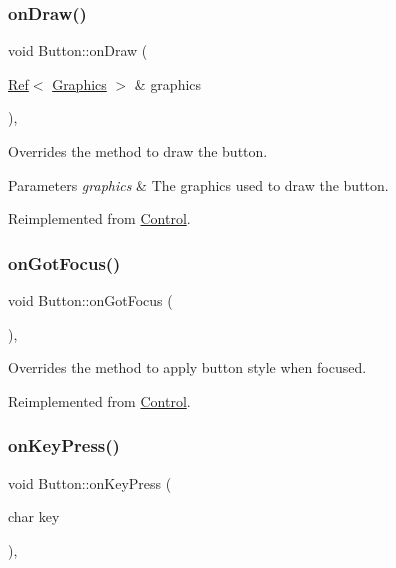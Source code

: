 \subsubsection{\texorpdfstring{onDraw()}{onDraw()}}
{\footnotesize\ttfamily void Button\+::on\+Draw (\begin{DoxyParamCaption}\item[{\mbox{\hyperlink{class_ref}{Ref}}$<$ \mbox{\hyperlink{class_graphics}{Graphics}} $>$ \&}]{graphics }\end{DoxyParamCaption})\hspace{0.3cm}{\ttfamily [override]}, {\ttfamily [virtual]}}



Overrides the method to draw the button. 


\begin{DoxyParams}{Parameters}
{\em graphics} & The graphics used to draw the button.\\
\hline
\end{DoxyParams}


Reimplemented from \mbox{\hyperlink{class_control_a5f89270d0d05a6bac9128db0b1d290d2}{Control}}.

\mbox{\label{class_button_a3fd6af2ee1bdd52a0b61177f80ff7d2c}} 
\subsubsection{\texorpdfstring{onGotFocus()}{onGotFocus()}}
{\footnotesize\ttfamily void Button\+::on\+Got\+Focus (\begin{DoxyParamCaption}{ }\end{DoxyParamCaption})\hspace{0.3cm}{\ttfamily [override]}, {\ttfamily [virtual]}}



Overrides the method to apply button style when focused. 



Reimplemented from \mbox{\hyperlink{class_control_ac21652bd9bd20bd53eeab52432556a0c}{Control}}.

\mbox{\label{class_button_ac697a388171f59e9953eb6ae1dcf37a1}} 
\subsubsection{\texorpdfstring{onKeyPress()}{onKeyPress()}}
{\footnotesize\ttfamily void Button\+::on\+Key\+Press (\begin{DoxyParamCaption}\item[{char}]{key }\end{DoxyParamCaption})\hspace{0.3cm}{\ttfamily [override]}, {\ttfamily [virtual]}}



